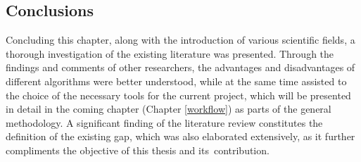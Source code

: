 

\subsection{Conclusions}

Concluding this chapter, along with the introduction of various scientific fields, a thorough investigation of the existing literature was presented. Through the findings and comments of other researchers, the advantages and disadvantages of different algorithms were better understood, while at the same time assisted to the choice of the necessary tools for the current project, which will be presented in detail in the coming chapter (Chapter \ref{workflow}) as parts of the general methodology. A significant finding of the literature review constitutes the definition of the existing gap, which was also elaborated extensively, as it further compliments the objective of this thesis and its~contribution.